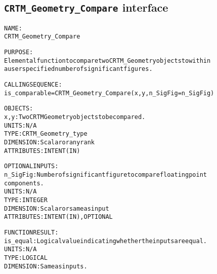 \subsection{\texttt{CRTM\_Geometry\_Compare} interface}
  \label{sec:CRTM_Geometry_Compare_interface}
  \begin{alltt}
  NAME:
        CRTM_Geometry_Compare
 
  PURPOSE:
        Elemental function to compare two CRTM_Geometry objects to within
        a user specified number of significant figures.
 
  CALLING SEQUENCE:
        is_comparable = CRTM_Geometry_Compare( x, y, n_SigFig=n_SigFig )
 
  OBJECTS:
        x, y:          Two CRTM Geometry objects to be compared.
                       UNITS:      N/A
                       TYPE:       CRTM_Geometry_type
                       DIMENSION:  Scalar or any rank
                       ATTRIBUTES: INTENT(IN)
 
  OPTIONAL INPUTS:
        n_SigFig:      Number of significant figure to compare floating point
                       components.
                       UNITS:      N/A
                       TYPE:       INTEGER
                       DIMENSION:  Scalar or same as input
                       ATTRIBUTES: INTENT(IN), OPTIONAL
 
  FUNCTION RESULT:
        is_equal:      Logical value indicating whether the inputs are equal.
                       UNITS:      N/A
                       TYPE:       LOGICAL
                       DIMENSION:  Same as inputs.
  \end{alltt}
